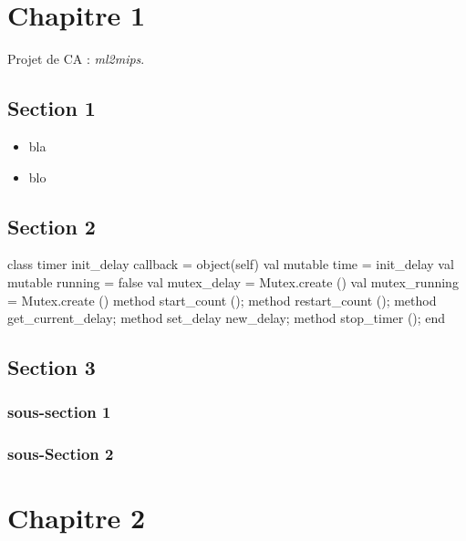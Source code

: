 \documentclass[a4paper, 11pt]{report}
\begin{document}
\chapter{Chapitre 1}

Projet de CA : \emph{ml2mips}.

\section{Section 1}

\begin{itemize}
\item bla
\item blo
\end{itemize}

\section{Section 2}

\begin{OCaml}
class timer init_delay callback = 
object(self)
  val mutable time = init_delay 
  val mutable running = false
  val mutex_delay = Mutex.create ()
  val mutex_running = Mutex.create ()
  method start_count ();
  method restart_count ();
  method get_current_delay;
  method set_delay new_delay;
  method stop_timer ();
end
\end{OCaml}

\section{Section 3}

\subsection{sous-section 1}

\subsection{sous-Section 2}


\chapter{Chapitre 2}
\end{document}
